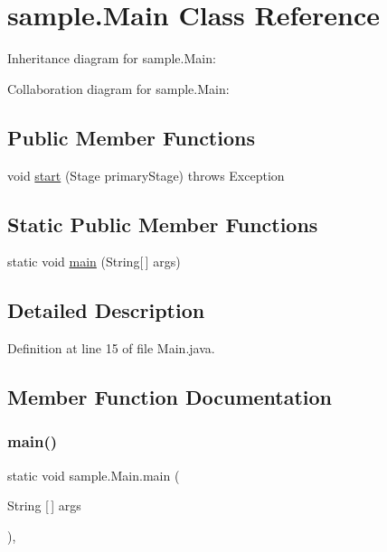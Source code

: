 \hypertarget{classsample_1_1_main}{}\section{sample.\+Main Class Reference}
\label{classsample_1_1_main}


Inheritance diagram for sample.\+Main\+:


Collaboration diagram for sample.\+Main\+:
\subsection*{Public Member Functions}
\begin{DoxyCompactItemize}
\item 
void \mbox{\hyperlink{classsample_1_1_main_a64ba37c898ca967654307543954cd09d}{start}} (Stage primary\+Stage)  throws Exception
\end{DoxyCompactItemize}
\subsection*{Static Public Member Functions}
\begin{DoxyCompactItemize}
\item 
static void \mbox{\hyperlink{classsample_1_1_main_ab70e98057c0f40b833a38ea10a74eceb}{main}} (String\mbox{[}$\,$\mbox{]} args)
\end{DoxyCompactItemize}


\subsection{Detailed Description}


Definition at line 15 of file Main.\+java.



\subsection{Member Function Documentation}
\mbox{\label{classsample_1_1_main_ab70e98057c0f40b833a38ea10a74eceb}} 
\subsubsection{\texorpdfstring{main()}{main()}}
{\footnotesize\ttfamily static void sample.\+Main.\+main (\begin{DoxyParamCaption}\item[{String \mbox{[}$\,$\mbox{]}}]{args }\end{DoxyParamCaption})\hspace{0.3cm}{\ttfamily [inline]}, {\ttfamily [static]}}



